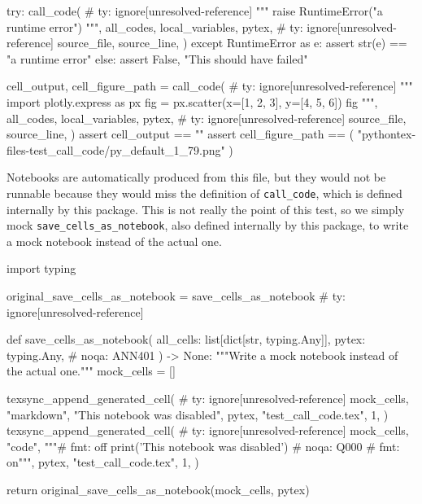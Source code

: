 \documentclass[oneside]{book}
\begin{document}
\begin{pycell}
try:
    call_code(  # ty: ignore[unresolved-reference]
        """
raise RuntimeError("a runtime error")
""",
        all_codes,
        local_variables,
        pytex,  # ty: ignore[unresolved-reference]
        source_file,
        source_line,
    )
except RuntimeError as e:
    assert str(e) == "a runtime error"
else:
    assert False, "This should have failed"
\end{pycell}

\begin{pycell}
cell_output, cell_figure_path = call_code(  # ty: ignore[unresolved-reference]
    """
import plotly.express as px
fig = px.scatter(x=[1, 2, 3], y=[4, 5, 6])
fig
""",
    all_codes,
    local_variables,
    pytex,  # ty: ignore[unresolved-reference]
    source_file,
    source_line,
)
assert cell_output == ""
assert cell_figure_path == (
    "pythontex-files-test_call_code/py_default_1_79.png"
)
\end{pycell}

Notebooks are automatically produced from this file, but they would not be runnable because they would miss the definition of \texttt{call\_code}, which is defined internally by this package. This is not really the point of this test, so we simply mock \texttt{save\_cells\_as\_notebook}, also defined internally by this package, to write a mock notebook instead of the actual one.

\begin{pycell}
import typing

original_save_cells_as_notebook = save_cells_as_notebook  # ty: ignore[unresolved-reference]


def save_cells_as_notebook(
    all_cells: list[dict[str, typing.Any]],
    pytex: typing.Any,  # noqa: ANN401
) -> None:
    """Write a mock notebook instead of the actual one."""
    mock_cells = []

    texsync_append_generated_cell(  # ty: ignore[unresolved-reference]
        mock_cells,
        "markdown",
        "This notebook was disabled",
        pytex,
        "test_call_code.tex",
        1,
    )
    texsync_append_generated_cell(  # ty: ignore[unresolved-reference]
        mock_cells,
        "code",
        """# fmt: off
print('This notebook was disabled')  # noqa: Q000
# fmt: on""",
        pytex,
        "test_call_code.tex",
        1,
    )

    return original_save_cells_as_notebook(mock_cells, pytex)
\end{pycell}
\end{document}
